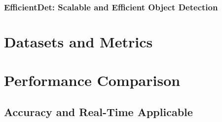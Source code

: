 \documentclass[12pt, oneside]{article}
\begin{document}
\subsubsection{EfficientDet: Scalable and Efficient Object Detection}


\section{Datasets and Metrics}


\section{Performance Comparison}


\subsection{Accuracy and Real-Time Applicable}


\newpage

\printbibliography
\end{document}
